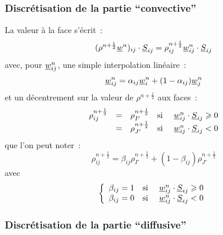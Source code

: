 \subsubsection*{Discr\'etisation de la partie ``convective''}

La valeur \`a la face s'\'ecrit~:
\begin{equation}
(\rho^{n+\frac{1}{2}} \underline{w}^n)_{ij} \cdot \underline{S}_{ij}
= \rho^{n+\frac{1}{2}}_{ij} \underline{w}^n_{ij} \cdot \underline{S}_{ij}
\end{equation}
avec, pour $\underline{w}^n_{ij}$,
une simple interpolation lin\'eaire~:
\begin{equation}
\underline{w}^n_{ij}
= \alpha_{ij} \underline{w}^n_i + (1-\alpha_{ij}) \underline{w}^n_j
\end{equation}
et un d\'ecentrement sur la valeur de $\rho^{n+\frac{1}{2}}$ aux faces~:
\begin{equation}
\begin{array}{lllll}
\displaystyle\rho_{ij}^{n+\frac{1}{2}} &=& \rho_{I'}^{n+\frac{1}{2}}
                &\text{si\ }& \underline{w}^n_{ij} \cdot \underline{S}_{ij} \geqslant 0 \\
                         &=& \rho_{J'}^{n+\frac{1}{2}}
                &\text{si\ }& \underline{w}^n_{ij} \cdot \underline{S}_{ij} < 0 \\
\end{array}
\end{equation}
que l'on peut noter~:
\begin{equation}
\displaystyle\rho_{ij}^{n+\frac{1}{2}}
 = \beta_{ij}\rho_{I'}^{n+\frac{1}{2}} + (1-\beta_{ij})\rho_{J'}^{n+\frac{1}{2}}
\end{equation}
avec
\begin{equation}
\left\{\begin{array}{lll}
\beta_{ij} = 1 & \text{si\ } & \underline{w}^n_{ij} \cdot \underline{S}_{ij} \geqslant 0 \\
\beta_{ij} = 0 & \text{si\ } & \underline{w}^n_{ij} \cdot \underline{S}_{ij} < 0 \\
\end{array}\right.
\end{equation}

\subsubsection*{Discr\'etisation de la partie ``diffusive''}

